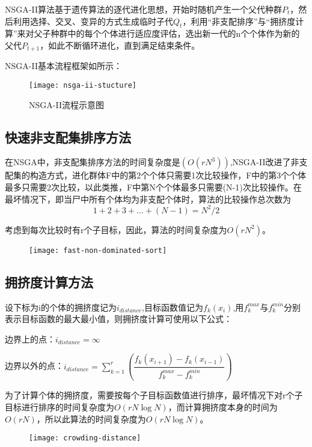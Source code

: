 \documentclass[lang=cn,a4paper,citestyle=gb7714-2015, bibstyle=gb7714-2015]{elegantpaper}
\begin{document}
    NSGA-II算法基于遗传算法的逐代进化思想，开始时随机产生一个父代种群$P_t$，然后利用选择、交叉、变异的方式生成临时子代$Q_t$，利用“非支配排序”与“拥挤度计算”来对父子种群中的每个个体进行适应度评估，选出新一代的n个个体作为新的父代$P_{t+1}$，如此不断循环进化，直到满足结束条件。

    NSGA-II基本流程框架如所示：
    \begin{figure}[!h]
        \centering
        \texttt{[image: nsga-ii-stucture]}
        \caption{NSGA-II流程示意图}
        \label{fig:nsga-ii-structure}
    \end{figure}

    \subsection{快速非支配集排序方法}
    在NSGA中，非支配集排序方法的时间复杂度是$(O(rN^3))$,NSGA-II改进了非支配集的构造方式，进化群体F中的第2个个体只需要1次比较操作，F中的第3个个体最多只需要2次比较，以此类推，F中第N个个体最多只需要(N-1)次比较操作。在最坏情况下，即当尸中所有个体均为非支配个体时，算法的比较操作总次数为
    $$1+2+3+\dots+(N-1)=N^2/2$$

    考虑到每次比较时有r个子目标，因此，算法的时间复杂度为$O(rN^2)$。
    \begin{figure}[!h]
        \centering
        \texttt{[image: fast-non-dominated-sort]}
    \end{figure}

    \subsection{拥挤度计算方法}
    设下标为i的个体的拥挤度记为$i_{distance}$,目标函数值记为$f_k(x_i)$,用$f_k^{max}$与$f_k^{min}$分别表示目标函数的最大最小值，则拥挤度计算可使用以下公式：

    边界上的点：$i_{distance}=\infty$

    边界以外的点：$i_{distance}= \sum\limits_{k=1}^r(\dfrac{f_k(x_{i+1}) - f_k(x_{i-1})}{f_k^{max} - f_k^{min}})$

    为了计算个体的拥挤度，需要按每个子目标函数值进行排序，最坏情况下对r个子目标进行排序的时间复杂度为$O(rN\log N)$，而计算拥挤度本身的时间为$O(rN)$，所以此算法的时间复杂度为$O(rN\log N)$。

    \begin{figure}[!h]
        \centering
        \texttt{[image: crowding-distance]}
    \end{figure}
\end{document}
